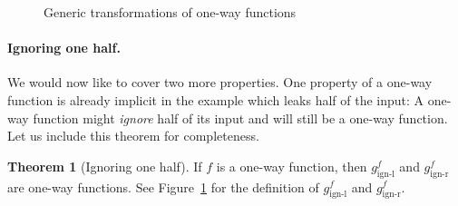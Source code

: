 \documentclass[a4paper,table,dvipsnames]{article}
\theoremstyle{definition}
\newtheorem{theorem}{Theorem}
\begin{document}
\begin{figure}
\begin{codebox}
	\begin{center}
		\begin{pchstack}
  		\begin{pcvstack}
					
  		\end{pcvstack}
					\pchspace
					\pchspace
					\pchspace
					\pchspace
		\end{pchstack}
	\end{center}
	\end{codebox}
\caption{Generic transformations of one-way functions\label{fig:owf-transforms}}
\end{figure}
\paragraph{Ignoring one half.} 
We would now like to cover two more properties. One property of a one-way function is already implicit in the example which leaks half of the input: A one-way function might \emph{ignore} half of its input and will still be a one-way function. Let us include this theorem for completeness.
\begin{theorem}[Ignoring one half]
If $f$ is a one-way function, then $g^f_{\text{ign-l}}$ and $g^f_{\text{ign-r}}$ are one-way functions. See Figure~\ref{fig:owf-transforms} for the definition of $g^f_{\text{ign-l}}$ and $g^f_{\text{ign-r}}$.
\end{theorem}
\end{document}
